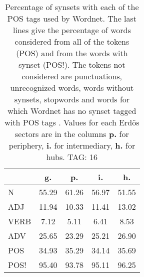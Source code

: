 \begin{table}[h!]
\begin{center}
\begin{tabular}{| l || c | c | c | c |}\hline
 & {\bf g.} & {\bf p.} & {\bf i.} & {\bf h.} \\\hline\hline
N & 55.29  & 61.26  & 56.97  & 51.55 \\\hline
ADJ & 11.94  & 10.33  & 11.41  & 13.02 \\\hline
VERB & 7.12  & 5.11  & 6.41  & 8.53 \\\hline
ADV & 25.65  & 23.29  & 25.21  & 26.90 \\\hline\hline
POS & 34.93  & 35.29  & 34.14  & 35.69 \\\hline
POS! & 95.40  & 93.78  & 95.11  & 96.25 \\\hline
\end{tabular}
\caption{Percentage of synsets with each of the POS tags used by Wordnet. The last lines give the percentage of words considered from all of the tokens (POS) and from the words with synset (POS!). The tokens not considered are punctuations, unrecognized words, words without synsets, stopwords and words for which Wordnet has no synset  tagged with POS tags . Values for each Erd\"os sectors are in the columns {{\bf p.}} for periphery, {{\bf i.}} for intermediary, {{\bf h.}} for hubs. TAG: 16}
\end{center}
\end{table}